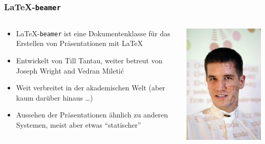 \documentclass{cms-kurs}
\begin{document}
\begin{frame}
  \frametitle{\LaTeX{}-\texttt{beamer}}

  \onslide<+->

  \begin{columns}
    \begin{column}{0.7\linewidth}
      \begin{itemize}
      \item \LaTeX-\texttt{beamer} ist eine Dokumentenklasse für das Erstellen von
        Präsentationen mit \LaTeX
      \item Entwickelt von Till Tantau, weiter betreut von Joseph Wright and
        Vedran Miletić
      \item Weit verbreitet in der akademischen Welt (aber kaum darüber hinaus
        \dots)
      \item Aussehen der Präsentationen ähnlich zu anderen Systemen, meist aber
        etwas \enquote{statischer}
      \end{itemize}
    \end{column}
    \begin{column}{0.3\linewidth}
      \includegraphics[width=.9\linewidth,keepaspectratio]{img/till-tantau}
    \end{column}
  \end{columns}

\end{frame}
\end{document}
